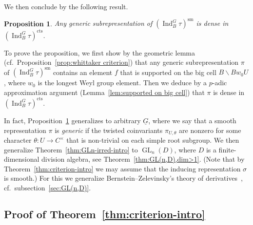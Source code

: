 \documentclass[a4paper]{amsart}
\numberwithin{equation}{section}
\newtheorem{prop}[thm]{Proposition}
\theoremstyle{remark}
\theoremstyle{definition}
\DeclareMathOperator{\Ind}{Ind}
\DeclareMathOperator{\GL}{GL}
\newcommand{\sm}{\mathrm{sm}}
\newcommand{\alggrp}[1]{\underline{#1}}
\newcommand{\cts}{\mathrm{cts}}
\begin{document}
We then conclude by the following result.

\begin{prop}\label{prop:generic-intro}
  Any generic subrepresentation of $(\Ind_{B}^{G} \tau)^\sm$ is dense in $(\Ind_{B}^{G} \tau)^\cts$.
\end{prop}

To prove the proposition, we first show by the geometric lemma (cf.\ Proposition~\ref{prop:whittaker criterion}) that any generic subrepresentation $\pi$ of $(\Ind_{B}^{G} \tau)^\sm$ contains an element $f$ that is supported on the big cell $B\backslash B w_0 U$, where $w_0$ is the longest Weyl group element.
Then we deduce by a $p$-adic approximation argument (Lemma~\ref{lem:supported on big cell}) that $\pi$ is dense in $(\Ind_{B}^{G} \tau)^\cts$.

In fact, Proposition~\ref{prop:generic-intro} generalizes to arbitrary $\alggrp G$, where we say that a smooth representation $\pi$ is \emph{generic} if the twisted coinvariants $\pi_{U,\theta}$ are nonzero for some character $\theta \colon U \to C^\times$ that is non-trivial on each simple root subgroup.
We then generalize Theorem~\ref{thm:GLn-irred-intro} to $\GL_n(D)$, where $D$ is a finite-dimensional division algebra, see Theorem~\ref{thm:GL(n,D),dim>1}.
(Note that by Theorem~\ref{thm:criterion-intro} we may assume that the inducing representation $\sigma$ is smooth.)
For this we generalize Bernstein--Zelevinsky's theory of derivatives~\cite{MR0579172}, cf.\ subsection~\ref{sec:GL(n,D)}.

\subsection{Proof of Theorem~\ref{thm:criterion-intro}}
\label{sec:proof-intro1}
\end{document}
